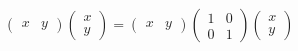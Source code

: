 \documentclass[preview]{standalone}
\begin{document}
\begin{align*}
\begin{pmatrix} x & y\end{pmatrix}\begin{pmatrix} x \\ y\end{pmatrix} = \begin{pmatrix} x & y\end{pmatrix}\begin{pmatrix}1 & 0 \\ 0 & 1\end{pmatrix}\begin{pmatrix} x \\ y\end{pmatrix}
\end{align*}
\end{document}
